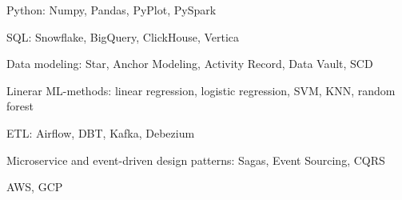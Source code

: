 \item Python: Numpy, Pandas, PyPlot, PySpark
\item SQL: Snowflake, BigQuery, ClickHouse, Vertica
\item Data modeling: Star, Anchor Modeling, Activity Record, Data Vault, SCD
\item Linerar ML-methods: linear regression, logistic regression, SVM, KNN,
  random forest
\item ETL: Airflow, DBT, Kafka, Debezium
\item Microservice and event-driven design patterns: Sagas, Event Sourcing,
  CQRS
\item AWS, GCP
